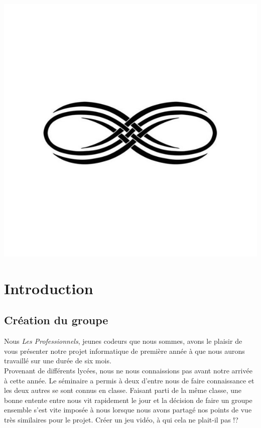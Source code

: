 \documentclass{report}
\begin{document}
\begin{center}
\includegraphics[scale=00.20]{infini}
\end{center}



\newpage


\thispagestyle{empty}
\tableofcontents

\newpage



\section[Introduction]{Introduction}

\subsection[Création du groupe]{Création du groupe}
Nous \emph{Les Professionnels}, jeunes codeurs que nous sommes, avons le plaisir de vous présenter notre projet informatique de première année à  que nous aurons travaillé sur une durée de six mois.\\

Provenant de différents lycées, nous ne nous connaissions pas avant notre arrivée à  cette année. Le séminaire a permis à deux d’entre nous de faire connaissance et les deux autres se sont connus en classe. Faisant parti de la même classe, une bonne entente entre nous vit rapidement le jour et la décision de faire un groupe ensemble s’est vite imposée à nous lorsque nous avons partagé nos points de vue très similaires pour le projet. Créer un jeu vidéo, à qui cela ne plait-il pas !?\\
\end{document}

